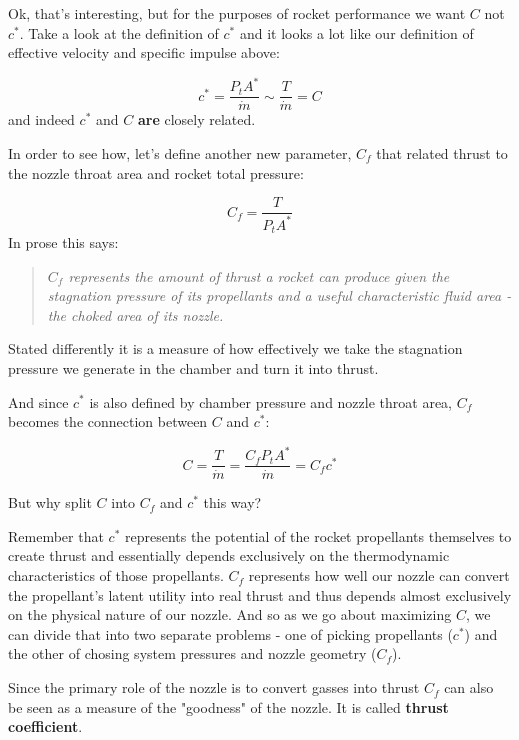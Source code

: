 \documentclass[twocolumn]{memoir} %
\begin{document}
Ok, that's interesting, but for the purposes of rocket performance we
want \(C\) not \(c^*\). Take a look at the definition of \(c^*\) and it
looks a lot like our definition of effective velocity and specific
impulse above:

\begin{equation}c^* = \frac{P_t A^*}{\dot{m}} \sim \frac{T}{\dot{m}} = C
\end{equation}
%
and indeed \(c^*\) and \(C\) \textbf{are} closely related.

In order to see how, let's define another new parameter, \(C_f\) that
related thrust to the nozzle throat area and rocket total pressure:

\begin{equation}C_f = \frac{T}{P_t A^*}
\end{equation}
%
In prose this says:
%
\begin{quote}
    \emph{\(C_f\) represents the amount of thrust a rocket can produce given the
stagnation pressure of its propellants and a useful characteristic fluid
    area - the choked area of its nozzle.}
\end{quote}

Stated differently it is a measure of how effectively we take the
stagnation pressure we generate in the chamber and turn it into thrust.

And since \(c^*\) is also defined by chamber pressure and nozzle throat
area, \(C_f\) becomes the connection between \(C\) and \(c^*\):

\begin{equation}
    C = \frac{T}{\dot{m}} = \frac{C_f P_t A^*}{\dot{m}} = C_f c^*
    \label{eq:C}
\end{equation}

But why split \(C\) into \(C_f\) and \(c^*\) this way?

Remember that \(c^*\) represents the potential of the rocket propellants
themselves to create thrust and essentially depends exclusively on the
thermodynamic characteristics of those propellants. \(C_f\) represents
how well our nozzle can convert the propellant's latent utility into
real thrust and thus depends almost exclusively on the physical nature
of our nozzle. And so as we go about maximizing \(C\), we can divide
that into two separate problems - one of picking propellants (\(c^*\))
and the other of chosing system pressures and nozzle geometry (\(C_f\)).

Since the primary role of the nozzle is to convert gasses into thrust
\(C_f\) can also be seen as a measure of the "goodness" of the nozzle.
It is called \textbf{thrust coefficient}.
\end{document}

